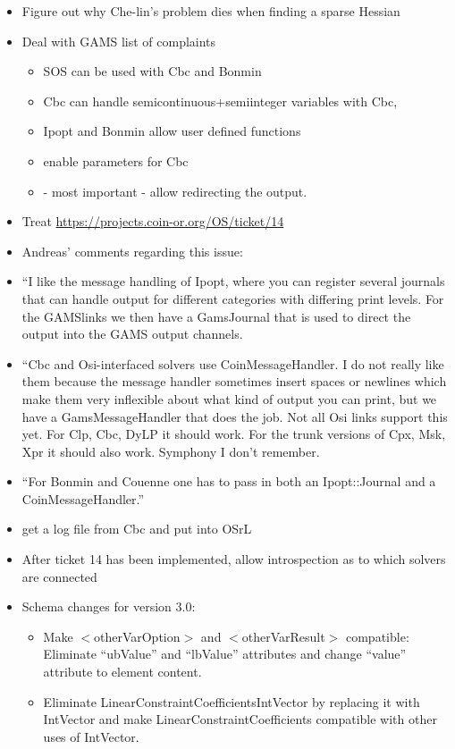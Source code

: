\begin{itemize}
\item Figure out why Che-lin's problem dies when finding a sparse Hessian

\item Deal with GAMS list of complaints

\begin{itemize}
\item SOS can be used with Cbc and Bonmin
\item Cbc can handle semicontinuous+semiinteger variables with Cbc, 
\item Ipopt and Bonmin allow user defined functions
\item enable parameters for Cbc 
\item - most important - allow redirecting the output.
\end{itemize}

\item Treat \url{https://projects.coin-or.org/OS/ticket/14} 

\item[] Andreas' comments regarding this issue:

\item[] ``I like the message handling of Ipopt, where you can register several
journals that can handle output for different categories with differing
print levels. For the GAMSlinks we then have a GamsJournal that is used
to direct the output into the GAMS output channels.

\item[] ``Cbc and Osi-interfaced solvers use CoinMessageHandler. I do not really
like them because the message handler sometimes insert spaces or
newlines which make them very inflexible about what kind of output you
can print, but we have a GamsMessageHandler that does the job. Not all
Osi links support this yet. For Clp, Cbc, DyLP it should work. For the
trunk versions of Cpx, Msk, Xpr it should also work. Symphony I don't
remember.

\item[] ``For Bonmin and Couenne one has to pass in both an Ipopt::Journal and a
CoinMessageHandler.''

\item get a log file from Cbc and put into OSrL

\item After ticket 14 has been implemented, allow introspection as to which solvers are connected 

\item Schema changes for version 3.0:

\begin{itemize}
\item Make $<$otherVarOption$>$ and $<$otherVarResult$>$ compatible: Eliminate ``ubValue'' and ``lbValue'' attributes and change ``value'' attribute to element content.

\item Eliminate LinearConstraintCoefficientsIntVector by replacing it with IntVector and make LinearConstraintCoefficients compatible with other uses of IntVector.

\end{itemize}

\end{itemize}

\fi
